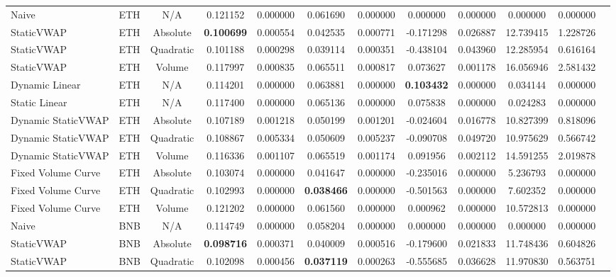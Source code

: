 \begin{table}[H]
{\begin{tabular}{llcccccccccc}
        \hline
        Naive & ETH & N/A & 0.121152 & 0.000000 & 0.061690 & 0.000000 & 0.000000 & 0.000000 & 0.000000 & 0.000000 \\
        StaticVWAP & ETH & Absolute & \textbf{0.100699} & 0.000554 & 0.042535 & 0.000771 & -0.171298 & 0.026887 & 12.739415 & 1.228726 \\
        StaticVWAP & ETH & Quadratic & 0.101188 & 0.000298 & 0.039114 & 0.000351 & -0.438104 & 0.043960 & 12.285954 & 0.616164 \\
        StaticVWAP & ETH & Volume & 0.117997 & 0.000835 & 0.065511 & 0.000817 & 0.073627 & 0.001178 & 16.056946 & 2.581432 \\
        Dynamic Linear & ETH & N/A & 0.114201 & 0.000000 & 0.063881 & 0.000000 & \textbf{0.103432} & 0.000000 & 0.034144 & 0.000000 \\
        Static Linear & ETH & N/A & 0.117400 & 0.000000 & 0.065136 & 0.000000 & 0.075838 & 0.000000 & 0.024283 & 0.000000 \\
        Dynamic StaticVWAP & ETH & Absolute & 0.107189 & 0.001218 & 0.050199 & 0.001201 & -0.024604 & 0.016778 & 10.827399 & 0.818096 \\
        Dynamic StaticVWAP & ETH & Quadratic & 0.108867 & 0.005334 & 0.050609 & 0.005237 & -0.090708 & 0.049720 & 10.975629 & 0.566742 \\
        Dynamic StaticVWAP & ETH & Volume & 0.116336 & 0.001107 & 0.065519 & 0.001174 & 0.091956 & 0.002112 & 14.591255 & 2.019878 \\
        Fixed Volume Curve & ETH & Absolute & 0.103074 & 0.000000 & 0.041647 & 0.000000 & -0.235016 & 0.000000 & 5.236793 & 0.000000 \\
        Fixed Volume Curve & ETH & Quadratic & 0.102993 & 0.000000 & \textbf{0.038466} & 0.000000 & -0.501563 & 0.000000 & 7.602352 & 0.000000 \\
        Fixed Volume Curve & ETH & Volume & 0.121202 & 0.000000 & 0.061560 & 0.000000 & 0.000962 & 0.000000 & 10.572813 & 0.000000 \\
        \hline
        Naive & BNB & N/A & 0.114749 & 0.000000 & 0.058204 & 0.000000 & 0.000000 & 0.000000 & 0.000000 & 0.000000 \\
        StaticVWAP & BNB & Absolute & \textbf{0.098716} & 0.000371 & 0.040009 & 0.000516 & -0.179600 & 0.021833 & 11.748436 & 0.604826 \\
        StaticVWAP & BNB & Quadratic & 0.102098 & 0.000456 & \textbf{0.037119} & 0.000263 & -0.555685 & 0.036628 & 11.970830 & 0.563751 \\

\end{tabular}}
\end{table}
